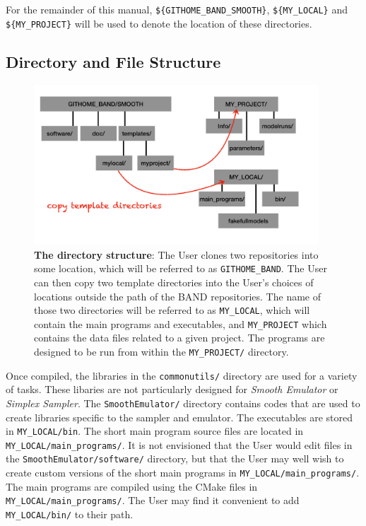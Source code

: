 \documentclass[UserManual.tex]{subfiles}
\begin{document}
For the remainder of this manual, {\tt \$\{GITHOME\_BAND\_SMOOTH\}}, {\tt \$\{MY\_LOCAL\}} and {\tt \$\{MY\_PROJECT\}} will be used to denote the location of these directories.

\subsection{Directory and File Structure}

\begin{figure}
\centerline{\includegraphics[width = 0.95\textwidth]{directorystructure}}
\caption{{\bf The directory structure}: The User clones two repositories into some location, which will be referred to as {\tt GITHOME\_BAND}. The User can then copy two template directories into the User's choices of locations outside the path of the BAND repositories. The name of those two directories will be referred to as {\tt MY\_LOCAL}, which will contain the main programs and executables, and {\tt MY\_PROJECT} which contains the data files related to a given project. The programs are designed to be run from within the {\tt MY\_PROJECT/} directory.}
\end{figure}

Once compiled, the libraries in the {\tt commonutils/} directory are used for a variety of tasks. These libaries are not particularly designed for {\it Smooth Emulator} or {\it Simplex Sampler}. The {\tt SmoothEmulator/} directory contains codes that are used to create libraries specific to the sampler and emulator. The executables are stored in {\tt MY\_LOCAL/bin}. The short main program source files are located in {\tt MY\_LOCAL/main\_programs/}. It is not envisioned that the User would edit files in the {\tt SmoothEmulator/software/} directory, but that the User may well wish to create custom versions of the short main programs in {\tt MY\_LOCAL/main\_programs/}. The main programs are compiled using the CMake files in {\tt MY\_LOCAL/main\_programs/}. The User may find it convenient to add {\tt MY\_LOCAL/bin/} to their path.
\end{document}
